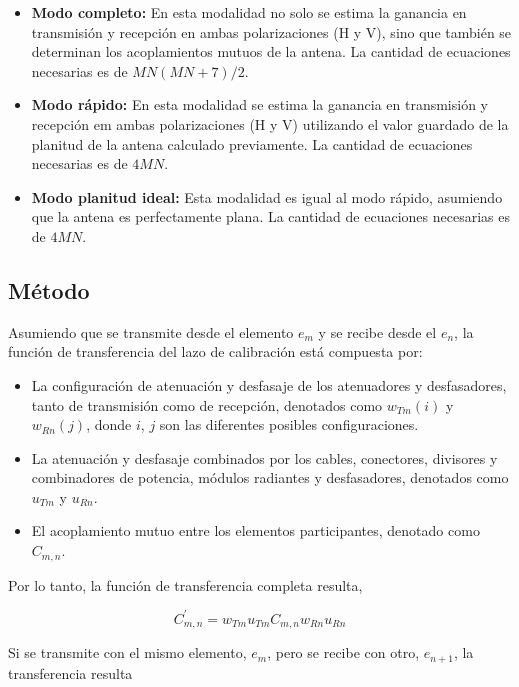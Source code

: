 \begin{itemize}
	\item \textbf{Modo completo:} En esta modalidad no solo se estima la ganancia en transmisión y recepción en ambas
		polarizaciones (H y V), sino que también se determinan los acoplamientos mutuos de la antena. La cantidad de ecuaciones necesarias es
		de $MN(MN + 7)/2$.
	\item \textbf{Modo rápido:} En esta modalidad se estima la ganancia en transmisión y recepción em ambas polarizaciones
		(H y V) utilizando el valor guardado de la planitud de la antena calculado previamente. La cantidad de ecuaciones necesarias
		es de $4MN$.
	\item \textbf{Modo planitud ideal:} Esta modalidad es igual al modo rápido, asumiendo que la antena es perfectamente plana.
		La cantidad de ecuaciones necesarias es de $4MN$.
\end{itemize}


\subsection{Método}

Asumiendo que se transmite desde el elemento $e_m$ y se recibe desde el $e_n$, la función de transferencia del lazo de
calibración está compuesta por:

\begin{itemize}
	\item La configuración de atenuación y desfasaje de los atenuadores y desfasadores, tanto de transmisión como de recepción,
		denotados como $w_{Tm}(i)$ y $w_{Rn}(j)$, donde $i$, $j$ son las diferentes posibles configuraciones.
	\item La atenuación y desfasaje combinados por los cables, conectores, divisores y combinadores de potencia, módulos radiantes
		y desfasadores, denotados como $u_{Tm}$ y $u_{Rn}$.
	\item El acoplamiento mutuo entre los elementos participantes, denotado como $C_{m, n}$.
\end{itemize}

Por lo tanto, la función de transferencia completa resulta,

\begin{equation}
	C^{'}_{m,n} = w_{Tm} u_{Tm} C_{m,n} w_{Rn} u_{Rn}
	\label{eq:transfer_mn}
\end{equation}

Si se transmite con el mismo elemento, $e_m$, pero se recibe con otro, $e_{n + 1}$, la transferencia resulta

